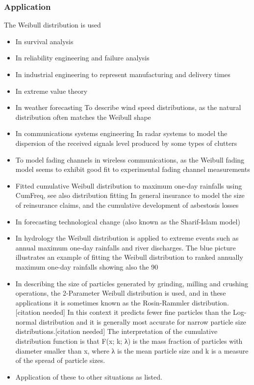 \subsubsection*{Application}
The Weibull distribution is used
\begin{itemize}
\item	 In survival analysis
\item	 In reliability engineering and failure analysis
\item	 In industrial engineering to represent manufacturing and delivery times
\item	 In extreme value theory
\item	 In weather forecasting To describe wind speed distributions, as the natural distribution often matches the Weibull shape
\item	 In communications systems engineering In radar systems to model the dispersion of the received signals level produced by some types of clutters
\item	 To model fading channels in wireless communications, as the Weibull fading model seems to exhibit good fit to experimental fading channel measurements
\item	 Fitted cumulative Weibull distribution to maximum one-day rainfalls using CumFreq, see also distribution fitting In general insurance to model the size of reinsurance claims, and the cumulative development of asbestosis losses
\item	 In forecasting technological change (also known as the Sharif-Islam model)
\item	 In hydrology the Weibull distribution is applied to extreme events such as annual maximum one-day rainfalls and river discharges. The blue picture illustrates an example of fitting the Weibull distribution to ranked annually maximum one-day rainfalls showing also the 90%
\item	 In describing the size of particles generated by grinding, milling and crushing operations, the 2-Parameter Weibull distribution is used, and in these applications it is sometimes known as the Rosin-Rammler distribution.[citation needed] In this context it predicts fewer fine particles than the Log-normal distribution and it is generally most accurate for narrow particle size distributions.[citation needed] The interpretation of the cumulative distribution function is that F(x; k; λ) is the mass fraction of particles with diameter smaller than x, where λ is the mean particle size and k is a measure of the spread of particle sizes.
\item	 Application of these to other situations as listed.
\end{itemize}
